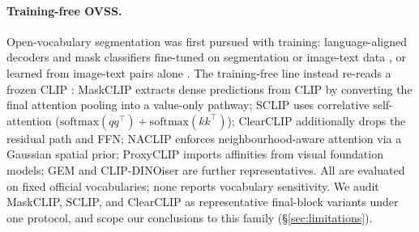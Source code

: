 \documentclass[11pt]{article}
\begin{document}
\paragraph{Training-free OVSS.} Open-vocabulary segmentation was first pursued with
training: language-aligned decoders and mask classifiers fine-tuned on segmentation or
image-text data \citep{li2022lseg,ghiasi2022openseg,xu2022groupvit,liang2023ovseg,xu2023san,cho2024catseg},
or learned from image-text pairs alone \citep{shin2022reco,cha2023tcl}. The
training-free line instead re-reads a frozen CLIP \citep{radford2021clip}:
MaskCLIP \citep{zhou2022maskclip} extracts dense
predictions from CLIP by converting the final attention pooling into a value-only
pathway; SCLIP \citep{wang2024sclip} uses correlative self-attention
($\mathrm{softmax}(qq^\top)+\mathrm{softmax}(kk^\top)$); ClearCLIP
\citep{lan2024clearclip} additionally drops the residual path and FFN; NACLIP
\citep{hajimiri2024naclip} enforces neighbourhood-aware attention via a Gaussian
spatial prior; ProxyCLIP \citep{lan2024proxyclip} imports affinities from visual
foundation models; GEM \citep{bousselham2024gem} and CLIP-DINOiser
\citep{wysoczanska2024clipdinoiser} are further representatives. All are evaluated on
fixed official vocabularies; none reports vocabulary sensitivity. We audit MaskCLIP,
SCLIP, and ClearCLIP as representative final-block variants under one protocol, and
scope our conclusions to this family (\S\ref{sec:limitations}).
\end{document}
